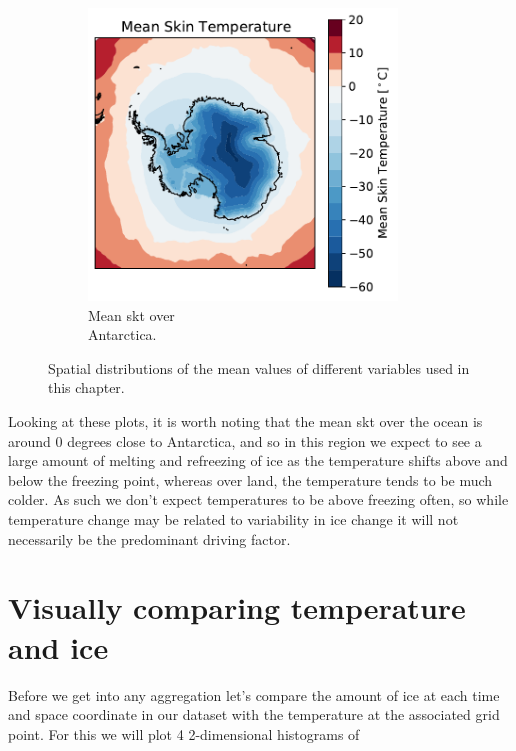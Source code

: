 \documentclass[../main.tex]{subfiles}
\begin{document}
\begin{figure}[ht!]
\begin{subfigure}[ht!]{0.49\textwidth}
\includegraphics[width=0.9\textwidth]{images/week8/hres/mean_skt_distribution}
\caption{Mean \gls{skt} over \\ Antarctica.}
\end{subfigure}
\caption{Spatial distributions of the mean values of different variables used in this chapter.}
\label{fig:mean_distributions}
\end{figure}

Looking at these plots, it is worth noting that the mean \gls{skt} over the ocean is around 0 degrees close to Antarctica, and so in this region we expect to see a large amount of melting and refreezing of ice as the temperature shifts above and below the freezing point, whereas over land, the temperature tends to be much colder. As such we don't expect temperatures to be above freezing often, so while temperature change may be related to variability in ice change it will not necessarily be the predominant driving factor. 


\section{Visually comparing temperature and ice}
Before we get into any aggregation let's compare the amount of ice at each time and space coordinate in our dataset with the temperature at the associated grid point. For this we will plot 4 2-dimensional histograms of 
\end{document}
